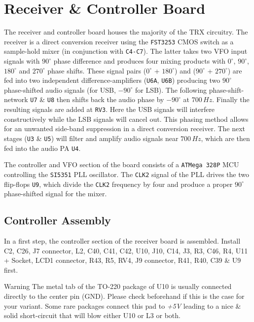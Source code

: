 \documentclass[10pt, a4paper,twoside,openright]{scrartcl}
\newenvironment{warning}{\begin{bclogo}[couleur=red!30,arrondi=.1,logo=\bcattention,ombre=true]{Warning}}{\end{bclogo}}
\begin{document}
\section{Receiver \& Controller Board} \label{sec:rx}
 The receiver and controller board houses the majority of the TRX circuitry. The receiver is a direct conversion receiver using the \texttt{FST3253} CMOS switch as a sample-hold mixer (in conjunction with \texttt{C4-C7}). The latter takes two VFO input signals with $90^\circ$ phase difference and produces four mixing products with $0^\circ$, $90^\circ$, $180^\circ$ and $270^\circ$ phase shifts. These signal pairs ($0^\circ$ + $180^\circ$) and ($90^\circ$ + $270^\circ$) are fed into two independent difference-amplifiers (\texttt{U6A}, \texttt{U6B}) producing two $90^\circ$ phase-shifted audio signals (for USB, $-90^\circ$ for LSB). The following phase-shift-network \texttt{U7} \& \texttt{U8} then shifts back the audio phase by $-90^\circ$ at $700\,Hz$. Finally the resulting signals are added at \texttt{RV3}. Here the USB signals will interfere constructively while the LSB signals will cancel out. This phasing method allows for an unwanted side-band suppression in a direct conversion receiver. The next stages (\texttt{U3} \& \texttt{U5}) will filter and amplify audio signals near $700\,Hz$, which are then fed into the audio PA \texttt{U4}. 
 
 The controller and VFO section of the board consists of a \texttt{ATMega 328P} MCU controlling the \texttt{SI5351} PLL oscillator. The \texttt{CLK2} signal of the PLL drives the two flip-flops \texttt{U9}, which divide the \texttt{CLK2} frequency by four and produce a proper $90^\circ$ phase-shifted signal for the mixer.
 
\subsection{Controller Assembly}
 In a first step, the controller section of the receiver board is assembled. Install C2, C26, J7 connector, L2, C40, C41, C42, U10, J10, C14, J3, R3, C46, R4, U11 + Socket, LCD1 connector, R43, R5, RV4, J9 connector, R41, R40, C39 \& U9 first. 

\begin{warning}
The metal tab of the TO-220 package of U10 is usually connected directly to the center pin (GND). Please check beforehand if this is the case for your variant. Some rare packages connect this pad to \emph{+5V} leading to a nice \& solid short-circuit that will blow either U10 or L3 or both.
\end{warning}
\end{document}
